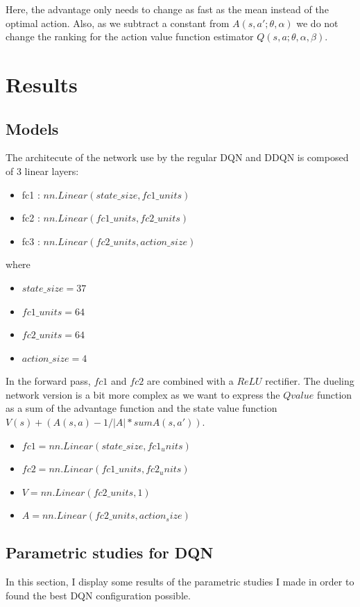 \documentclass[12pt]{article}
\begin{document}
Here, the advantage only needs to change as fast as the mean instead of the optimal action. Also, as we subtract a constant from $A(s,a';\theta,\alpha)$ we do not change the ranking for the action value function estimator $Q(s,a;\theta,\alpha,\beta)$.


\section*{Results} 
\subsection{Models}
The architecute of the network use by the regular DQN and DDQN is composed of 3 linear layers:

\begin{itemize}
\item fc1 : $nn.Linear(state\_size, fc1\_units)$
\item fc2 : $nn.Linear(fc1\_units, fc2\_units)$
\item fc3 : $nn.Linear(fc2\_units, action\_size)$
\end{itemize}
 
where 

\begin{itemize}
\item $state\_size=37$
\item $fc1\_units=64$
\item $fc2\_units=64$
\item $action\_size=4$
\end{itemize}

In the forward pass, $fc1$ and $fc2$ are combined with a $ReLU$ rectifier.
The dueling network version is a bit more complex as we want to express the $Q value$ function as a sum of the advantage function and the state value function $V(s) + (A(s,a) - 1/|A| * sum A(s,a'))$.

\begin{itemize}
\item $fc1 = nn.Linear(state\_size, fc1_units)$
\item $fc2 = nn.Linear(fc1\_units, fc2_units)$
\item $V = nn.Linear(fc2\_units, 1)$
\item $A = nn.Linear(fc2\_units, action_size)$
\end{itemize}


\subsection{Parametric studies for DQN}
In this section, I display some results of the parametric studies I made in order to found the best DQN configuration possible. 
\end{document}

